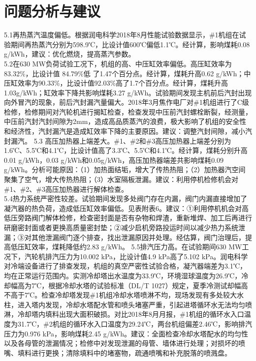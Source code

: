\documentclass[a4paper, 11pt]{article}
\begin{document}
\section{问题分析与建议}
5.1再热蒸汽温度偏低。根据润电科学2018年8月性能试验数据显示，\#1机组在试验期间再热蒸汽分别为598.9℃，比设计值600℃偏低1.1℃。经计算，影响煤耗0.08 g/kWh，建议：优化燃烧，提高蒸汽参数。\\
\indent
5.2在630 MW负荷试验工况下，机组的高、中压缸效率偏低。高压缸效率为83.32\%，比设计值 84.79\%低 了1.47个百分点。经计算，煤耗升高0.62 g/kWh；中压缸效率为90.33\%，比设计值92.03\%高了1.7个百分点。经计算，煤耗升高1.03g/kWh；缸效率下降共影响煤耗3.27 g/kWh。试验期间发现主机前后汽封出现向外冒汽的现象，前后汽封漏汽量偏大。2018年3月焦作电厂对\#1机组进行了C级检修，检修期间对汽轮机进行揭缸检查，检查发现中压前汽封螺栓断裂，经测量，中压前汽封汽封间隙为2mm，造成高品质蒸汽的浪费，极大影响了机组的安全性和经济性，汽封漏汽是造成缸效率下降的主要原因。建议：调整汽封间隙，减小汽封漏汽。
5.3 高压加热器上端差大。\#1、\#2和\#3高压加热器上端差分别为1.6℃、5.5℃和4.1℃，比设计值高了3.3℃、5.5℃和4.1℃。经计算，煤耗分别升高0.01 g/kWh，0.03 g/kWh和0.05g/kWh，高压加热器端差共影响煤耗0.09 g/kWh。分析可能原因：（1）加热面结垢，增大了传热热阻；（2）加热器汽空间聚集了空气，增大传热热阻；（3）水室隔板泄漏。建议：利用停机检修机会对\#1、\#2、\#3高压加热器进行解体检查。\\
\indent
5.4热力系统严密性较差。试验期间发现多处阀门存在内漏，阀门内漏直接增加了凝汽器的热负荷，造成低压缸效率偏低。见表附表6。建议：①利用停机机会对高低压旁路阀门解体检修，检查密封面是否有杂物和焊渣，重新堆焊、加工后再进行研磨密封面或者更换高质量密封垫；②减少启机旁路投运时间以减少热力系统泄漏；③对其他泄漏阀门逐个排查，找出泄漏原因并处理。经估算，阀门治理后，提高低压缸效率，煤耗降低约2.83 g/kWh。
5.5排汽压力高。在试验期间630 MW工况下，汽轮机排汽压力为10.002 kPa，比设计值4.9 kPa高了5.102 kPa。润电科学对冷端设备进行了排查发现，机组的真空严密性试验合格，凝汽器端差为3.1℃，均在正常运行范围内。实测冷却塔出水温度为33.9℃，环境湿球温度为26.9℃，冷却幅高为7℃，根据冷却水塔的试验标准（DL/T 1027）规定，夏季冷测试却幅高不高于7℃。检查冷却塔发现\#1机组冷却水塔喷淋不均，现场发现有多处较大水柱，进入塔内发现，冷却水塔配水管和喷头堵塞严重，引起进塔循环水无法均匀喷淋，冷却塔内填料出现大面积破损。对比2018年8月月报，\#1机组的循环水入口温度为31.7℃，\#2机组的循环水入口温度为29.24℃，两台机组偏差2.46℃，影响排汽压力为0.976 kPa，影响煤耗2.45 g/kWh。建议：全面检查冷却水塔配水的均匀性以及各母管的泄漏情况；检修中对发现泄漏的母管、墙体进行处理；对损坏的喷嘴、填料进行更换；清除填料中的堵塞物，疏通喷嘴和补充脱落的喷溅盘。\\
\end{document}

